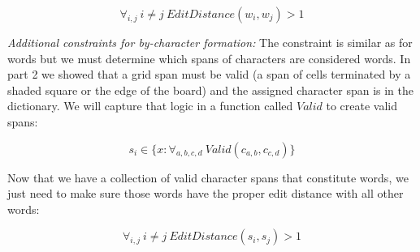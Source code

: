 \documentclass[11pt, letterpaper]{hw}
\begin{document}
\begin{enumerate}
$$\forall_{i, j} \ i \neq j \ EditDistance(w_i, w_j) > 1$$

\textit{Additional constraints for by-character formation:} The constraint is similar as for words but we must determine which spans of characters are considered words. In part 2 we showed that a grid span must be valid (a span of cells terminated by a shaded square or the edge of the board) and the assigned character span is in the dictionary. We will capture that logic in a function called $Valid$ to create valid spans:

$$s_i \in \{ x : \forall_{a,b,c,d} \ Valid(c_{a,b}, c_{c,d})\}$$

Now that we have a collection of valid character spans that constitute words, we just need to make sure those words have the proper edit distance with all other words:

$$\forall_{i, j} \ i \neq j \ EditDistance(s_i, s_j) > 1$$



\end{enumerate}
\end{document}
